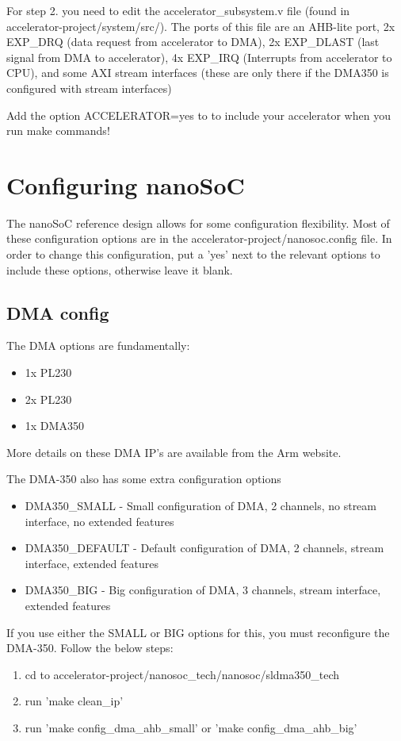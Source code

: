 \documentclass{report}
\makeatletter
\newenvironment{infobox}[1][]{%
   \begin{info@box}%
      \begin{tcolorbox}[colback=red!15!white,%
            colframe=red!75!black,%
            title=Additional information\ifstrempty{#1}{}{: #1}.%
         ]%
}{%
      \end{tcolorbox}%
   \end{info@box}%
}
\makeatother
\begin{document}
For step 2. you need to edit the accelerator\_subsystem.v file (found in accelerator-project/system/src/). The ports of this file are an AHB-lite 
port, 2x EXP\_DRQ (data request from accelerator to DMA), 2x EXP\_DLAST (last signal from DMA to accelerator), 
4x EXP\_IRQ (Interrupts from accelerator to CPU), and some AXI stream interfaces (these are only there if the DMA350 is configured 
with stream interfaces)

\begin{infobox}
    Add the option ACCELERATOR=yes to to include your accelerator when you run make commands!
\end{infobox} \par


\section{Configuring nanoSoC}
The nanoSoC reference design allows for some configuration flexibility. Most of these configuration options are in the 
accelerator-project/nanosoc.config file. In order to change this configuration, put a 'yes' next to the relevant options 
to include these options, otherwise leave it blank.
\subsection{DMA config}
The DMA options are fundamentally:
\begin{itemize}
    \item 1x PL230
    \item 2x PL230
    \item 1x DMA350
\end{itemize}
More details on these DMA IP's are available from the Arm website. 

The DMA-350 also has some extra configuration options
\begin{itemize}
    \item DMA350\_SMALL - Small configuration of DMA, 2 channels, no stream interface, no extended features
    \item DMA350\_DEFAULT - Default configuration of DMA, 2 channels, stream interface, extended features
    \item DMA350\_BIG - Big configuration of DMA, 3 channels, stream interface, extended features
\end{itemize}

If you use either the SMALL or BIG options for this, you must reconfigure the DMA-350. Follow the below steps:
\begin{enumerate}
    \item cd to accelerator-project/nanosoc\_tech/nanosoc/sldma350\_tech
    \item run 'make clean\_ip'
    \item run 'make config\_dma\_ahb\_small' or 'make config\_dma\_ahb\_big'
\end{enumerate}
\end{document}

